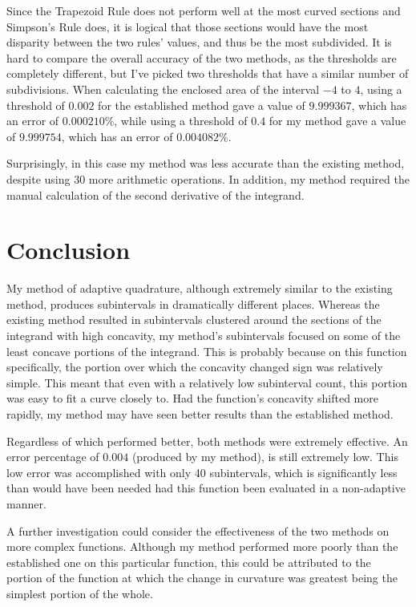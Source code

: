 \documentclass{paper}
\begin{document}
Since the Trapezoid Rule does not perform well at the most curved sections and Simpson's Rule does, it is logical that those sections would have the most disparity between the two rules' values, and thus be the most subdivided.
It is hard to compare the overall accuracy of the two methods, as the thresholds are completely different, but I've picked two thresholds that have a similar number of subdivisions.
When calculating the enclosed area of the interval \(-4\) to \(4\), using a threshold of \(0.002\) for the established method gave a value of \(9.999367\), which has an error of \(0.000210\%\), while using a threshold of \(0.4\) for my method gave a value of \(9.999754\), which has an error of \(0.004082\%\).

Surprisingly, in this case my method was less accurate than the existing method, despite using 30 more arithmetic operations.
In addition, my method required the manual calculation of the second derivative of the integrand.

\section{Conclusion}
\label{sec:conclusion}
My method of adaptive quadrature, although extremely similar to the existing method, produces subintervals in dramatically different places.
Whereas the existing method resulted in subintervals clustered around the sections of the integrand with high concavity, my method's subintervals focused on some of the least concave portions of the integrand.
This is probably because on this function specifically, the portion over which the concavity changed sign was relatively simple.
This meant that even with a relatively low subinterval count, this portion was easy to fit a curve closely to.
Had the function's concavity shifted more rapidly, my method may have seen better results than the established method.

Regardless of which performed better, both methods were extremely effective. An error percentage of \(0.004\) (produced by my method), is still extremely low.
This low error was accomplished with only 40 subintervals, which is significantly less than would have been needed had this function been evaluated in a non-adaptive manner.

A further investigation could consider the effectiveness of the two methods on more complex functions.
Although my method performed more poorly than the established one on this particular function, this could be attributed to the portion of the function at which the change in curvature was greatest being the simplest portion of the whole.

\label{mylastpage}
\newpage
{}
\listoffigures
\vspace{1cm}
\listofsnippets
\vspace{1cm}
{}
\printbibliography
\thispagestyle{frontorback}
\end{document}
